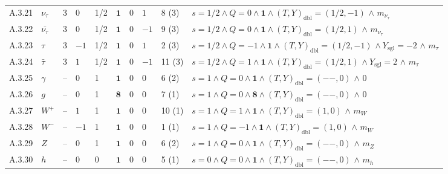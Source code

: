 {\begin{longtable}{@{}lllllllll>{\raggedright\arraybackslash}p{7.4cm}@{}}
A.3.21 & $\nu_\tau$ & 3 & $0$ & 1/2 & $\mathbf{1}$ & $0$ & $1$ & 8 (3) & $s{=}1/2 \wedge Q{=}0 \wedge \mathbf{1} \wedge (T,Y)_{\mathrm{dbl}}{=}(1/2,-1)$ $\wedge$ $m_{\nu_\tau}$ \\
A.3.22 & $\bar{\nu_\tau}$ & 3 & $0$ & 1/2 & $\mathbf{1}$ & $0$ & $-1$ & 9 (3) & $s{=}1/2 \wedge Q{=}0 \wedge \mathbf{1} \wedge (T,Y)_{\mathrm{dbl}}{=}(1/2,1)$ $\wedge$ $m_{\nu_\tau}$ \\
A.3.23 & $\tau$ & 3 & $-1$ & 1/2 & $\mathbf{1}$ & $0$ & $1$ & 2 (3) & $s{=}1/2 \wedge Q{=}-1 \wedge \mathbf{1} \wedge (T,Y)_{\mathrm{dbl}}{=}(1/2,-1)$ $\wedge\ Y_{\mathrm{sgl}}{=}-2$ $\wedge$ $m_{\tau}$ \\
A.3.24 & $\bar{\tau}$ & 3 & $1$ & 1/2 & $\mathbf{1}$ & $0$ & $-1$ & 11 (3) & $s{=}1/2 \wedge Q{=}1 \wedge \mathbf{1} \wedge (T,Y)_{\mathrm{dbl}}{=}(1/2,1)$ $\wedge\ Y_{\mathrm{sgl}}{=}2$ $\wedge$ $m_{\tau}$ \\
A.3.25 & $\gamma$ & -- & $0$ & 1 & $\mathbf{1}$ & $0$ & $0$ & 6 (2) & $s{=}1 \wedge Q{=}0 \wedge \mathbf{1} \wedge (T,Y)_{\mathrm{dbl}}{=}(--,0)$ $\wedge$ $0$ \\
A.3.26 & $g$ & -- & $0$ & 1 & $\mathbf{8}$ & $0$ & $0$ & 7 (1) & $s{=}1 \wedge Q{=}0 \wedge \mathbf{8} \wedge (T,Y)_{\mathrm{dbl}}{=}(--,0)$ $\wedge$ $0$ \\
A.3.27 & $W^+$ & -- & $1$ & 1 & $\mathbf{1}$ & $0$ & $0$ & 10 (1) & $s{=}1 \wedge Q{=}1 \wedge \mathbf{1} \wedge (T,Y)_{\mathrm{dbl}}{=}(1,0)$ $\wedge$ $m_{W}$ \\
A.3.28 & $W^-$ & -- & $-1$ & 1 & $\mathbf{1}$ & $0$ & $0$ & 1 (1) & $s{=}1 \wedge Q{=}-1 \wedge \mathbf{1} \wedge (T,Y)_{\mathrm{dbl}}{=}(1,0)$ $\wedge$ $m_{W}$ \\
A.3.29 & $Z$ & -- & $0$ & 1 & $\mathbf{1}$ & $0$ & $0$ & 6 (2) & $s{=}1 \wedge Q{=}0 \wedge \mathbf{1} \wedge (T,Y)_{\mathrm{dbl}}{=}(--,0)$ $\wedge$ $m_{Z}$ \\
A.3.30 & $h$ & -- & $0$ & 0 & $\mathbf{1}$ & $0$ & $0$ & 5 (1) & $s{=}0 \wedge Q{=}0 \wedge \mathbf{1} \wedge (T,Y)_{\mathrm{dbl}}{=}(--,0)$ $\wedge$ $m_{h}$ \\
\end{longtable}}
